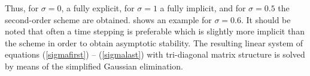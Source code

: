 Thus, for $\sigma=0$, a fully explicit, for $\sigma=1$ a fully
implicit, and for $\sigma=0.5$ the \cite{CrankNicolson47}
second-order scheme are obtained.  shows an
example for $\sigma=0.6$. It should be noted that often a time
stepping is preferable which is slightly more implicit than the
\cite{CrankNicolson47} scheme in order to obtain
asymptotic stability.  The resulting linear system of equations
(\ref{sigmafirst}) -- (\ref{sigmalast}) with tri-diagonal matrix
structure is solved by means of the simplified Gaussian
elimination.

